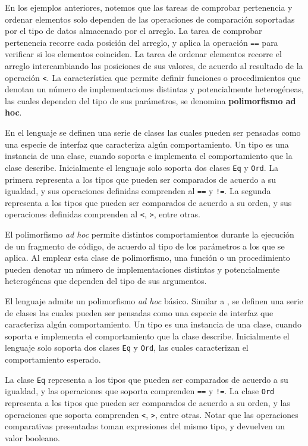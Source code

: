 En los ejemplos anteriores, notemos que las tareas de comprobar pertenencia y ordenar elementos solo dependen de las operaciones de comparación soportadas por el tipo de datos almacenado por el arreglo.
La tarea de comprobar pertenencia recorre cada posición del arreglo, y aplica la operación \lstinline[style = lang]{==} para verificar si los elementos coinciden.
La tarea de ordenar elementos recorre el arreglo intercambiando las posiciones de sus valores, de acuerdo al resultado de la operación \lstinline[style = lang]{<}.
La característica que permite definir funciones o procedimientos que denotan un número de implementaciones distintas y potencialmente heterogéneas, las cuales dependen del tipo de sus parámetros, se denomina \textbf{polimorfismo ad hoc}.

En el lenguaje se definen una serie de clases las cuales pueden ser pensadas como una especie de interfaz que caracteriza algún comportamiento.
Un tipo es una instancia de una clase, cuando soporta e implementa el comportamiento que la clase describe.
Inicialmente el lenguaje solo soporta dos clases \lstinline[style = lang]{Eq} y \lstinline[style = lang]{Ord}.
La primera representa a los tipos que pueden ser comparados de acuerdo a su igualdad, y sus operaciones definidas comprenden al \lstinline[style = lang]{==} y \lstinline[style = lang]{!=}.
La segunda representa a los tipos que pueden ser comparados de acuerdo a su orden, y sus operaciones definidas comprenden al \lstinline[style = lang]{<}, \lstinline[style = lang]{>}, entre otras.
\fi

\iffalse
El polimorfismo \textit{ad hoc} permite distintos comportamientos durante la ejecución de un fragmento de código, de acuerdo al tipo de los parámetros a los que se aplica.
Al emplear esta clase de polimorfismo, una función o un procedimiento pueden denotar un número de implementaciones distintas y potencialmente heterogéneas que dependen del tipo de sus argumentos.

El lenguaje admite un polimorfismo \textit{ad hoc} básico.
Similar a \Haskell, se definen una serie de clases las cuales pueden ser pensadas como una especie de interfaz que caracteriza algún comportamiento.
Un tipo es una instancia de una clase, cuando soporta e implementa el comportamiento que la clase describe.
Inicialmente el lenguaje solo soporta dos clases \lstinline[style = lang]{Eq} y \lstinline[style = lang]{Ord}, las cuales caracterizan el comportamiento esperado.

La clase \lstinline[style = lang]{Eq} representa a los tipos que pueden ser comparados de acuerdo a su igualdad, y las operaciones que soporta comprenden \lstinline[style = lang]{==} y \lstinline[style = lang]{!=}.
La clase \lstinline[style = lang]{Ord} representa a los tipos que pueden ser comparados de acuerdo a su orden, y las operaciones que soporta comprenden \lstinline[style = lang]{<}, \lstinline[style = lang]{>}, entre otras.
Notar que las operaciones comparativas presentadas toman expresiones del mismo tipo, y devuelven un valor booleano.

